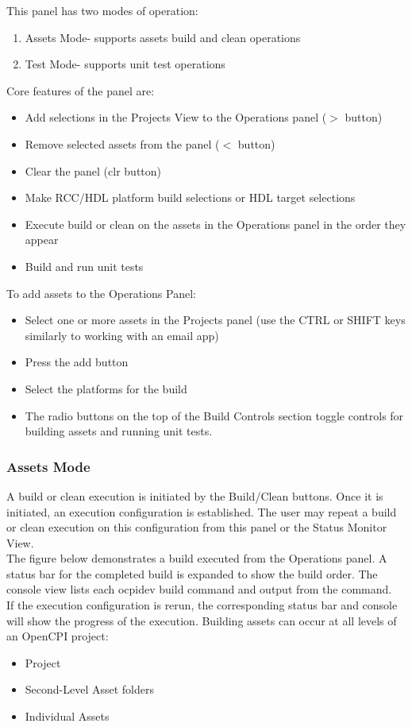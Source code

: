 \documentclass[10pt, a4paper, oneside]{article}
\begin{document}
This panel has two modes of operation: \begin{enumerate}
\item Assets Mode- supports assets build and clean operations
\item Test Mode- supports unit test operations
\end{enumerate}
Core features of the panel are:
\begin{itemize}
\item Add  selections in the Projects View to the Operations panel ($>$ button)
\item Remove selected assets from the panel ($<$ button)
\item Clear the panel (clr button)
\item Make RCC/HDL platform build selections or HDL target selections
\item Execute build or clean on the assets in the Operations panel in the order they appear
\item Build and run unit tests
\end{itemize}
To add assets to the Operations Panel:
\begin{itemize}
\item Select one or more assets in the Projects panel (use the CTRL or SHIFT keys similarly to working with an email app)
\item Press the add button
\item Select the platforms for the build
\item[] The radio buttons on the top of the Build Controls section toggle controls for building assets and running unit tests.
\end{itemize}

\subsubsection{Assets Mode}
A build or clean execution is initiated by the Build/Clean buttons. Once it is initiated, an execution configuration is established. The user may repeat a build or clean execution on this configuration  from this panel or the Status Monitor View.\\

The figure below demonstrates a build executed from the Operations panel. A status bar for the completed build is expanded to show the build order. The console view lists each ocpidev build command and output from the command.\\

If the execution configuration is rerun, the corresponding status bar and console will show the progress of the execution. Building assets can occur at all levels of an OpenCPI project:
\begin{itemize}
\item Project
\item Second-Level Asset folders
\item Individual Assets
\end{itemize}
\end{document}
